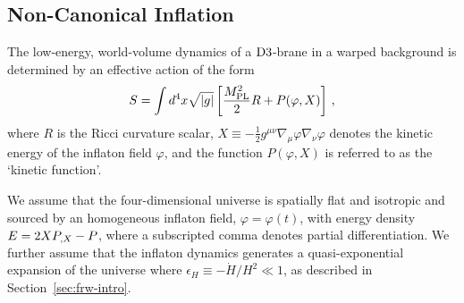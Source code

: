 \subsection{Non-Canonical Inflation} 
\label{sec:noncanoninfl}


The low-energy, world-volume dynamics of a 
${\rm D3}$-brane in a warped background is determined 
by an effective action of the form 
% 
\begin{equation}
\label{eq:DBIaction-dbiintro2}
S=\int  d^4x \sqrt{|g|} \left[ \frac{M_{\mathrm{PL}}^2}{2} R 
+ P (\varphi , X) \right] \,,
\end{equation}
% 
where $R$ is the Ricci curvature scalar, 
$X \equiv -\frac{1}{2}g^{\mu \nu}\nabla_\mu \varphi \nabla_\nu \varphi$
denotes the kinetic energy of the inflaton field $\varphi$, and the function  
$P (\varphi , X)$ is referred to as the `kinetic function'.  


We assume that the four-dimensional universe is   
spatially flat and isotropic and sourced by an  
homogeneous inflaton field, $\varphi =\varphi (t)$, with energy 
density $E = 2XP_{,X} - P$, where a subscripted comma denotes partial
differentiation. 
We further assume that the inflaton dynamics  
generates a quasi-exponential expansion of the universe 
where $\epsilon_H \equiv -\dot{H}/H^2 \ll1$,
as described in Section~\ref{sec:frw-intro}. 


